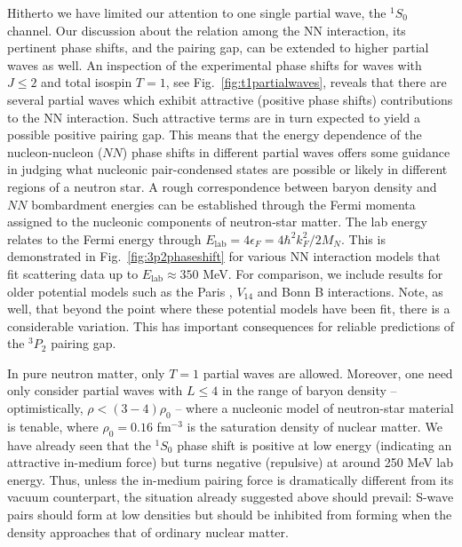 \documentclass[rmp,preprint,aps,floatfix]{revtex4}
\begin{document}
Hitherto we have limited our attention to one single partial wave,
the $^1S_0$ channel. 
Our discussion about the relation among the NN interaction, its
pertinent phase shifts, and
the pairing gap, can be extended to higher partial waves as well. 
An inspection
of the experimental phase shifts for waves with $J \leq 2$ and total 
isospin $T=1$, see
Fig.~\ref{fig:t1partialwaves},
reveals that there are several partial waves which exhibit
attractive (positive phase shifts) contributions
to the NN interaction. Such attractive terms are in turn expected to
yield a possible positive pairing gap. This means that
the energy dependence of the nucleon-nucleon ($NN$) phase shifts in different 
partial waves offers some guidance in judging what nucleonic pair-condensed 
states are possible or likely in different regions of a neutron star.
A rough correspondence between baryon density and $NN$ bombardment energies
can be established through the Fermi momenta assigned to the nucleonic
components of neutron-star matter.
The lab energy relates to the Fermi energy through 
$E_{\mathrm{lab}}=4\epsilon_F=4\hbar^2k_F^2/2M_N$. 
This is demonstrated in Fig.~\ref{fig:3p2phaseshift} for various NN interaction
models that fit scattering data up to $E_{\mathrm{lab}}\approx 350$ MeV.
For comparison, we include results for older 
potential models such as the Paris 
\cite{paris}, $V_{14}$ \cite{v14} and Bonn B \cite{mach89} 
interactions. Note, as well, that 
beyond the point where these potential models 
have been fit, there is a considerable variation. This has important 
consequences for reliable predictions of the $^3P_2$ pairing gap.

In pure neutron matter, only $T=1$ partial waves are allowed.  
Moreover, one need only consider partial 
waves with $L\leq 4$ in the range of baryon density -- optimistically,
$\rho < (3-4) \rho_0$ -- where a nucleonic model of neutron-star material 
is tenable, where $\rho_0=0.16$ fm$^{-3}$ is
the saturation density of nuclear matter.  
We have already seen that the $^1S_0$ phase shift is positive at low energy 
(indicating an attractive in-medium force) but turns negative (repulsive) 
at around 250 MeV lab energy.  Thus, unless the in-medium pairing force 
is dramatically different from its vacuum counterpart, the situation 
already suggested above should prevail:  S-wave pairs should form at 
low densities but should be inhibited from forming when the density 
approaches that of ordinary nuclear matter.  
\end{document}
